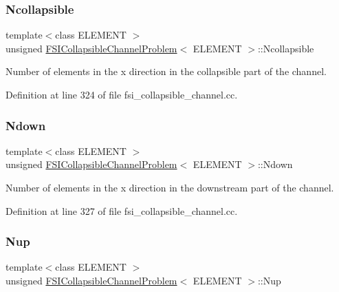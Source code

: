 \subsubsection{\texorpdfstring{Ncollapsible}{Ncollapsible}}
{\footnotesize\ttfamily template$<$class E\+L\+E\+M\+E\+NT $>$ \\
unsigned \hyperlink{classFSICollapsibleChannelProblem}{F\+S\+I\+Collapsible\+Channel\+Problem}$<$ E\+L\+E\+M\+E\+NT $>$\+::Ncollapsible\hspace{0.3cm}{\ttfamily [private]}}



Number of elements in the x direction in the collapsible part of the channel. 



Definition at line 324 of file fsi\+\_\+collapsible\+\_\+channel.\+cc.

\mbox{\label{classFSICollapsibleChannelProblem_a64c0aa974b39527ef22e352a4f22b156}} 
\subsubsection{\texorpdfstring{Ndown}{Ndown}}
{\footnotesize\ttfamily template$<$class E\+L\+E\+M\+E\+NT $>$ \\
unsigned \hyperlink{classFSICollapsibleChannelProblem}{F\+S\+I\+Collapsible\+Channel\+Problem}$<$ E\+L\+E\+M\+E\+NT $>$\+::Ndown\hspace{0.3cm}{\ttfamily [private]}}



Number of elements in the x direction in the downstream part of the channel. 



Definition at line 327 of file fsi\+\_\+collapsible\+\_\+channel.\+cc.

\mbox{\label{classFSICollapsibleChannelProblem_a22a5ea767bf0c437b78ed4e37b7a4818}} 
\subsubsection{\texorpdfstring{Nup}{Nup}}
{\footnotesize\ttfamily template$<$class E\+L\+E\+M\+E\+NT $>$ \\
unsigned \hyperlink{classFSICollapsibleChannelProblem}{F\+S\+I\+Collapsible\+Channel\+Problem}$<$ E\+L\+E\+M\+E\+NT $>$\+::Nup\hspace{0.3cm}{\ttfamily [private]}}



